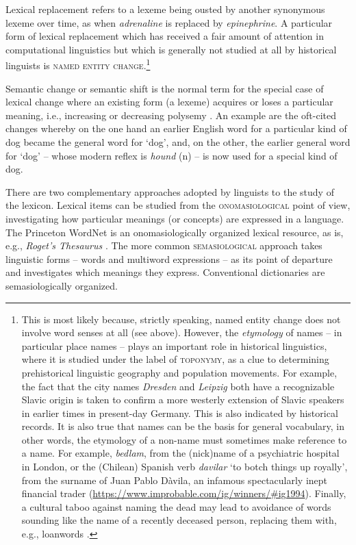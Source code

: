 \documentclass[output=paper]{langsci/langscibook}
\begin{document}
Lexical replacement refers to a lexeme being ousted by another synonymous lexeme over time, as when \emph{adrenaline} is replaced by \emph{epinephrine}. 
A particular form of
lexical replacement which has received a fair amount of attention in
computational linguistics but which is generally not studied at all by
historical linguists is \textsc{named entity change}.\footnote{This is most likely because, strictly speaking, named entity change
does not involve word senses at all (see above). However, the \emph{etymology} of names -- in particular place names -- plays
  an important role in historical linguistics, where it is studied under the label of \textsc{toponymy}, as a clue to
  determining prehistorical linguistic geography and population
  movements. For example, the fact that the city names \emph{Dresden} and
  \emph{Leipzig} both have a recognizable Slavic origin is taken to
  confirm a more westerly extension of Slavic speakers in earlier
  times in present-day Germany. This is also indicated  by historical records. It is also true that names can be the basis for general vocabulary, in other words, the etymology of a non-name must sometimes make reference to a name. For example, \emph{bedlam}, from the (nick)name of a psychiatric hospital in London, or the (Chilean) Spanish verb \emph{davilar} `to botch things up royally', from the surname of Juan Pablo Dàvila, an infamous spectacularly inept financial trader (\url{https://www.improbable.com/ig/winners/\#ig1994}). Finally, a cultural taboo against naming the dead may lead to avoidance of words sounding like the name of a recently deceased person, replacing them with, e.g., loanwords \citep[8f]{alper-nash-1999}.}

Semantic change or semantic shift is the normal term for the special case of lexical
change where an existing form (a lexeme) acquires or loses a particular meaning,
i.e., increasing or decreasing polysemy
\citep{traugott2001regularity,fortson-2003,newman-2016,traugott-2017}. An example are the oft-cited changes whereby on the one hand an earlier English word for a
particular kind of dog became the general word for `dog', and,
on the other, the earlier general word for `dog' -- whose modern reflex
is \emph{hound} (n) -- is now used for a special kind of dog.

There are two complementary approaches adopted by linguists to
the study of the lexicon. Lexical items can be studied from the
\textsc{onomasiological} point of view, investigating how particular
meanings (or concepts) are expressed in a language. The Princeton
WordNet \citep{fellbaum-1998} is an onomasiologically organized
lexical resource, as is, e.g., \emph{Roget's Thesaurus}
\citep{roget-1852}.  The more common \textsc{semasiological} approach
takes linguistic forms -- words and multiword expressions -- as its
point of departure and investigates which meanings they express. Conventional dictionaries are semasiologically organized.
\end{document}
